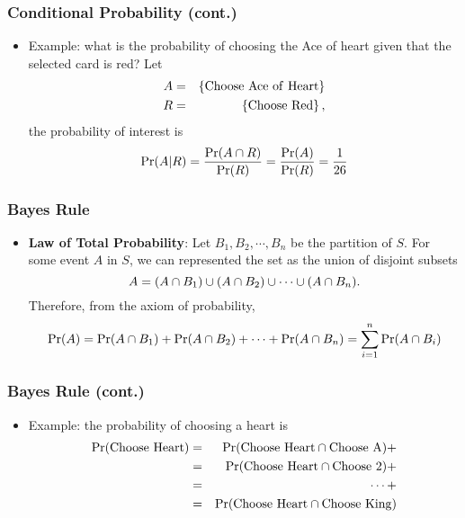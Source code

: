 \documentclass[pdflatex, 12pt]{beamer}
\begin{document}
\begin{frame}
\frametitle{Conditional Probability (cont.)}
\begin{itemize}
\item Example: what is the probability of choosing the Ace of heart given that the selected card is red? Let
 \begin{eqnarray}
 A &=& \left\{\mathrm{Choose \ Ace \ of \ Heart}\right\} \notag \\
 R &=& \left\{\mathrm{Choose \ Red}\right\}, \notag
 \end{eqnarray}
the probability of interest is 
 \begin{equation}
 \Pr(A|R) = \frac{\Pr(A \cap R)}{\Pr(R)} = \frac{\Pr(A)}{\Pr(R)} = \frac{1}{26} \notag
 \end{equation}
\end{itemize}
\end{frame}

\begin{frame}
\frametitle{Bayes Rule}
\begin{itemize}
\item \textbf{Law of Total Probability}: Let $B_1, B_2, \cdots, B_n$ be the partition of $S$. For some event $A$ in $S$, we can represented the set as the union of disjoint subsets 
 \begin{equation}
 A = (A \cap B_1) \cup (A \cap B_2) \cup \cdots \cup (A \cap B_n). \notag
 \end{equation}
Therefore, from the axiom of probability,
 {\small
 \begin{equation}
 \Pr(A) = \Pr(A \cap B_1) + \Pr(A \cap B_2) + \cdots + \Pr(A \cap B_n) = \sum_{i = 1}^{n} \Pr(A \cap B_i) \notag
 \end{equation}
 }
\end{itemize}
\end{frame}

\begin{frame}
\frametitle{Bayes Rule (cont.)}
\begin{itemize}
\item Example: the probability of choosing a heart is 
 \begin{eqnarray}
 \Pr(\mathrm{Choose \ Heart}) &=& \Pr(\mathrm{Choose \ Heart} \cap \mathrm{Choose \ A}) + \notag \\
 &=& \Pr(\mathrm{Choose \ Heart} \cap \mathrm{Choose}\ 2) + \notag \\
 &=& \cdots + \notag \\
 &=& \Pr(\mathrm{Choose \ Heart} \cap \mathrm{Choose \ King}) \notag 
 \end{eqnarray}
\end{itemize}
\end{frame}
\end{document}
